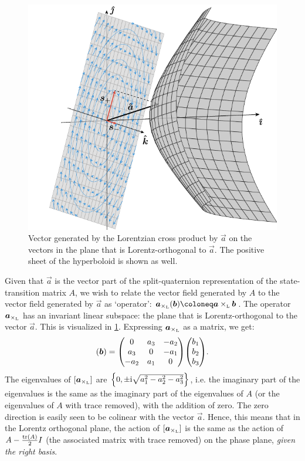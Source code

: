 \begin{figure}[ht]
    \centering
    \includegraphics[scale=1]{media/other/cross_product.pdf}
    \caption{Vector generated by the Lorentzian cross product by $\vec{a}$ on the vectors in the plane that is Lorentz-orthogonal to $\vec{a}$. The positive sheet of the hyperboloid is shown as well.}
    \label{fig:cross_product}
\end{figure}

Given that $\vec{a}$ is the vector part of the split-quaternion representation of the state-transition matrix $A$, we wish to relate the vector field generated by $A$ to the vector field generated by $\vec{a}$ as `operator': $\vec{a}_{\lorcrossp{}{}}(\vec{b}) \coloneq \lorcrossp{\vec{a}}{\vec{b}}$. The operator $\vec{a}_{\lorcrossp{}{}}$ has an invariant linear subspace: the plane that is Lorentz-orthogonal to the vector $\vec{a}$. This is visualized in \cref{fig:cross_product}. Expressing $\vec{a}_{\lorcrossp{}{}}$ as a matrix, we get:
\begin{equation}
    [\vec{a}_{\lorcrossp{}{}}](\vec{b}) = \mqty(0 & a_3 & -a_2 \\ a_3 & 0 & -a_1 \\ -a_2 & a_1 & 0) \mqty(b_1\\b_2\\b_3).
\end{equation}
The eigenvalues of $ [\vec{a}_{\lorcrossp{}{}}] $  are $\qty{0, \pm \ensuremath{\mathrm{i}}\sqrt{a_1^2 - a_2^2 - a_3^2}}$, i.e. the imaginary part of the eigenvalues is the same as the imaginary part of the eigenvalues of $A$ (or the eigenvalues of $A$ with trace removed), with the addition of zero. The zero direction is easily seen to be colinear with the vector $\vec{a}$.  Hence, this means that in the Lorentz orthogonal plane, the action of $ [\vec{a}_{\lorcrossp{}{}}] $ is the same as the action of $A - \frac{\tr(A)}{2}I$ (the associated matrix with trace removed) on the phase plane, \emph{given the right basis}.

